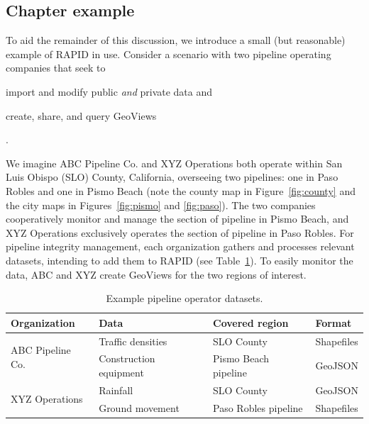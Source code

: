 
\subsection{Chapter example}
To aid the remainder of this discussion, we introduce a small (but reasonable) example of RAPID in use. Consider a scenario with two pipeline operating companies that seek to
\begin{enumerate*}[label=\itshape\alph*\upshape)]
\item import and modify public \textit{and} private data and
\item create, share, and query GeoViews
\end{enumerate*}.

We imagine ABC Pipeline Co. and XYZ Operations both operate within San Luis Obispo (SLO) County, California, overseeing two pipelines: one in Paso Robles and one in Pismo Beach (note the county map in Figure~\ref{fig:county} and the city maps in Figures~\ref{fig:pismo}  and \ref{fig:paso}). The two companies cooperatively monitor and manage the section of pipeline in Pismo Beach, and XYZ Operations exclusively operates the section of pipeline in Paso Robles. For pipeline integrity management, each organization gathers and processes relevant datasets, intending to add them to RAPID (see Table~\ref{table:layers}). To easily monitor the data, ABC and XYZ create GeoViews for the two regions of interest.

\begin{table}[h]

\begin{tabular}{ |l|l|l|l| }
\hline
Organization & Data & Covered region & Format\\
\hline
\multirow{2}{*}{ABC Pipeline Co.}
 & Traffic densities & SLO County & Shapefiles \\ \cline{2-4}
 & Construction equipment & Pismo Beach pipeline & GeoJSON \\ \hline
\multirow{2}{*}{XYZ Operations}
 & Rainfall & SLO County & GeoJSON \\ \cline{2-4}
 & Ground movement & Paso Robles pipeline & Shapefiles \\ \hline
\end{tabular}
\caption{Example pipeline operator datasets.}
\label{table:layers}
\end{table}

